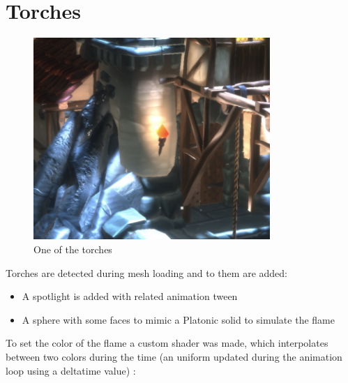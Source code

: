 \documentclass[10pt,a4paper]{article}
\begin{document}
\section{Torches}

\begin{figure}[H]
\centering
\caption{One of the torches}
\includegraphics[width=0.8\textwidth]{torch}
\end{figure}


Torches are detected during mesh loading and to them are added:

\begin{itemize}
 \item A spotlight is added with related animation tween
 \item A sphere with some faces to mimic a Platonic solid to simulate the flame
\end{itemize}

To set the color of the flame a custom shader was made, which interpolates between two colors during the time (an uniform updated during the animation loop using a deltatime value) :
\end{document}
